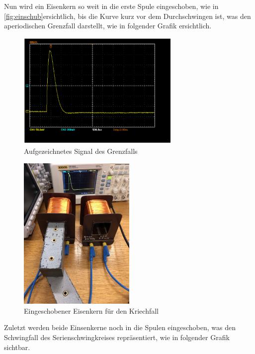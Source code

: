 \documentclass[11pt,ngerman]{scrartcl}
\begin{document}
Nun wird ein Eisenkern so weit in die erste Spule eingeschoben, wie in \autoref{fig:einschub}ersichtlich, bis die Kurve kurz vor dem Durchschwingen ist, was den aperiodischen Grenzfall darstellt, wie in folgender Grafik ersichtlich.

\begin{figure}[H]
	\begin{center}
		\includegraphics[width=0.7\textwidth]{Bild_versuch3_b}
	\end{center}
	\caption{Aufgezeichnetes Signal des Grenzfalls}
	\label{fig:grenzfall}
\end{figure}

\begin{figure}[H]
	\begin{center}
		\includegraphics[angle=-90,width=0.5\textwidth]{einschub}
	\end{center}
	\caption{Eingeschobener Eisenkern für den Kriechfall}
	\label{fig:einschub}
\end{figure}

Zuletzt werden beide Einsenkerne noch in die Spulen eingeschoben, was den Schwingfall des Serienschwingkreises repräsentiert, wie in folgender Grafik sichtbar.
\end{document}
